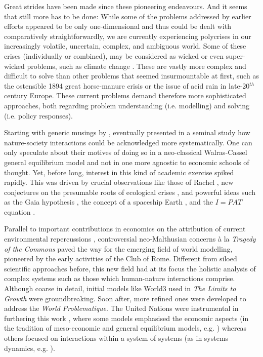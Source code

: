\documentclass{article}
\begin{document}
\begin{refsection}
Great strides have been made since these pioneering endeavours. And it seems that still more has to be done: While some of the problems addressed by earlier efforts appeared to be only one-dimensional and thus could be dealt with comparatively straightforwardly, we are currently experiencing polycrises in our increasingly volatile, uncertain, complex, and ambiguous world. Some of these crises (individually or combined), may be considered as wicked \parencite{rittel_1973, termeer_2019,lonngren_2021} or even super-wicked problems, such as climate change \parencite{levin_2012}. These are vastly more complex and difficult to solve than other problems that seemed insurmountable at first, such as the ostensible 1894 great horse-manure crisis or the issue of acid rain in late-20$^{th}$ century Europe. These current problems demand therefore more sophisticated approaches, both regarding problem understanding (i.e. modelling) and solving (i.e. policy responses). 

Starting with generic musings by \textcite{daly_1968,isard_1968,cumberland_1966}, \textcite{ayres_kneese_1969} eventually presented in a seminal study how nature-society interactions could be acknowledged more systematically. One can only speculate about their motives of doing so in a neo-classical Walras-Cassel general equilibrium model and not in one more agnostic to economic schools of thought. Yet, before long, interest in this kind of academic exercise spiked rapidly. This was driven by crucial observations like those of Rachel \textcite{carson_1962}, new conjectures on the presumable roots of ecological crises \parencite{white_1967}, and powerful ideas such as the Gaia hypothesis \parencite{lovelock_1972,lovelock_1974}, the concept of a spaceship Earth \parencite{boulding_1966}, and the $I=PAT$ equation \parencite{ehrlich_1972,commoner_1972,chertow_2001}.

Parallel to important contributions in economics on the attribution of current environmental repercussions \parencite[see for example][]{leontief_1970,leontief_1972}, controversial neo-Malthusian concerns à la \textit{Tragedy of the Commons} \parencite{hardin_1968,ostrom_1999,mildenberger_2019} paved the way for the emerging field of world modelling, pioneered by the early activities of the Club of Rome. Different from siloed scientific approaches before, this new field had at its focus the holistic analysis of complex systems such as those which human-nature interactions comprise. Although coarse in detail, initial models like World3 used in \textit{The Limits to Growth} \parencite{meadows_1972} were groundbreaking. Soon after, more refined ones were developed to address the \textit{World Problematique}. The United Nations were instrumental in furthering this work \parencite{fontela_2004}, where some models emphasised the economic aspects (in the tradition of meso-economic and general equilibrium models, e.g. \textcite{leontief_1974}) whereas others focused on interactions within a system of systems (as in systems dynamics, e.g. \textcite{mesarovic_1974}).


\end{refsection}
\end{document}
